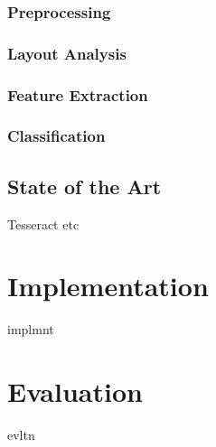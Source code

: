 \documentclass{article}
\begin{document}
  \subsubsection{Preprocessing}
  \subsubsection{Layout Analysis}
  \subsubsection{Feature Extraction}
  \subsubsection{Classification}

\subsection{State of the Art}
  Tesseract etc

\newpage
\section{Implementation}
implmnt

\newpage
\section{Evaluation}
evltn

\newpage


\end{document}
